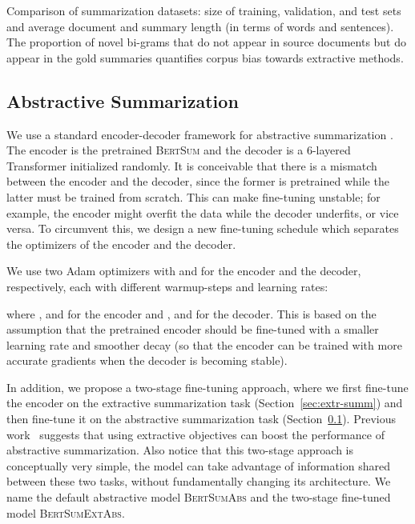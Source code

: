 \documentclass[11pt,a4paper]{article}
\begin{document}
\begin{table*}[!htbp]
        \caption{\label{tab:statistics} Comparison of summarization datasets: size of training, validation,
            and test sets and average 
            document  and summary length (in terms of words and
            sentences). The proportion of novel bi-grams that do not
            appear in source documents but do appear in the gold summaries 
            quantifies corpus bias towards extractive
            methods.}  
    \end{table*}
    
    
    
    \subsection{Abstractive Summarization}
    \label{sec:abstr-summ}
    
    We use a standard encoder-decoder framework for abstractive
    summarization \cite{see-acl17}. The encoder is the pretrained
    \textsc{BertSum} and the decoder is a 6-layered Transformer
    initialized randomly.  It is conceivable that there is a mismatch
    between the encoder and the decoder, since the former is pretrained
    while the latter must be trained from scratch. This can make
    fine-tuning unstable; for example, the encoder might overfit the data
    while the decoder underfits, or vice versa.  To circumvent this, we
    design a new fine-tuning schedule which separates the optimizers of
    the encoder and the decoder.
    


    We use two Adam optimizers with  and
     for the encoder and the decoder, respectively, each
    with different warmup-steps and learning rates:
    
    where , and
     for the encoder and
    , and  for
    the decoder. This is based on the assumption that the pretrained
    encoder should be fine-tuned with a smaller learning rate and smoother
    decay (so that  the encoder can be trained with more accurate gradients when the decoder is becoming stable).
    
    In addition, we propose a two-stage fine-tuning approach, where we
    first fine-tune the encoder on the extractive summarization task
    (Section~\ref{sec:extr-summ}) and then fine-tune it on the abstractive
    summarization task (Section~\ref{sec:abstr-summ}). Previous
    work~\cite{gehrmann2018bottom,li2018improving} suggests that using
    extractive objectives can boost the performance of abstractive
    summarization. Also notice that this two-stage approach is
    conceptually very simple, the model can take advantage of information
    shared between these two tasks, without fundamentally changing its
    architecture.  We name the default abstractive model
    \textsc{BertSumAbs} and the two-stage fine-tuned model
    \textsc{BertSumExtAbs}.
    
\end{document}
